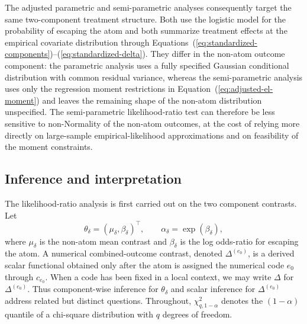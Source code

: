 \documentclass[11pt]{article}
\begin{document}
The adjusted parametric and semi-parametric analyses consequently target the same two-component treatment structure. Both use the logistic model for the probability of escaping the atom and both summarize treatment effects at the empirical covariate distribution through Equations~(\ref{eq:standardized-components})--(\ref{eq:standardized-delta}). They differ in the non-atom outcome component: the parametric analysis uses a fully specified Gaussian conditional distribution with common residual variance, whereas the semi-parametric analysis uses only the regression moment restrictions in Equation~(\ref{eq:adjusted-el-moment}) and leaves the remaining shape of the non-atom distribution unspecified. The semi-parametric likelihood-ratio test can therefore be less sensitive to non-Normality of the non-atom outcomes, at the cost of relying more directly on large-sample empirical-likelihood approximations and on feasibility of the moment constraints.

\subsection{Inference and interpretation}

The likelihood-ratio analysis is first carried out on the two component contrasts. Let
\[
  \theta_\delta=(\mu_\delta,\beta_\delta)^\top,
  \qquad
  \alpha_\delta=\exp(\beta_\delta),
\]
where $\mu_\delta$ is the non-atom mean contrast and $\beta_\delta$ is the log odds-ratio for escaping the atom. A numerical combined-outcome contrast, denoted $\Delta^{(e_0)}$, is a derived scalar functional obtained only after the atom is assigned the numerical code $e_0$ through $c_{e_0}$. When a code has been fixed in a local context, we may write $\Delta$ for $\Delta^{(e_0)}$. Thus component-wise inference for $\theta_\delta$ and scalar inference for $\Delta^{(e_0)}$ address related but distinct questions. Throughout, $\chi^2_{q,1-\alpha}$ denotes the $(1-\alpha)$ quantile of a chi-square distribution with $q$ degrees of freedom.
\end{document}
